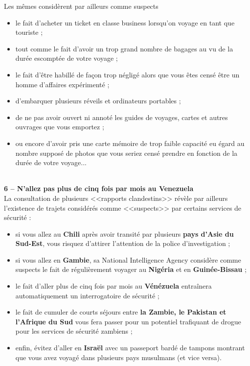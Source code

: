 \documentclass[11pt,twoside,a4paper]{article}
\begin{document}
Les m{\^e}mes consid{\`e}rent par ailleurs comme suspects
\begin{itemize}
	\item le fait d'acheter un ticket en classe business lorsqu'on voyage en tant que touriste ;
	\item tout comme le fait d'avoir un trop grand nombre de bagages au vu de la dur{\'e}e escompt{\'e}e de votre voyage ;
	\item le fait d'{\^e}tre habill{\'e} de fa\c{c}on trop n{\'e}glig{\'e} alors que vous {\^e}tes cens{\'e} {\^e}tre un homme d'affaires exp{\'e}riment{\'e} ;
	\item d'embarquer plusieurs r{\'e}veils et ordinateurs portables ;
	\item de ne pas avoir ouvert ni annot{\'e} les guides de voyages, cartes et autres ouvrages que vous emportez ;
	\item ou encore d'avoir pris une carte m{\'e}moire de trop faible capacit{\'e} eu {\'e}gard au nombre suppos{\'e} de photos que vous seriez cens{\'e} prendre en fonction de la dur{\'e}e de votre voyage...
\end{itemize}~\\

\textbf{\large 6 -- N'allez pas plus de cinq fois par mois au Venezuela}~\\

La consultation de plusieurs <<rapports clandestins>> r{\'e}v{\`e}le par ailleurs l'existence de trajets consid{\'e}r{\'e}s comme <<suspects>> par certains services de s{\'e}curit{\'e} :
\begin{itemize}
	\item si vous allez au \textbf{Chili} apr{\`e}s avoir transit{\'e} par plusieurs \textbf{pays d'Asie du Sud-Est}, vous risquez d'attirer l'attention de la police d'investigation ;
	\item si vous allez en \textbf{Gambie}, sa National Intelligence Agency consid{\`e}re comme suspects le fait de r{\'e}guli{\`e}rement voyager au \textbf{Nig{\'e}ria} et en \textbf{Guin{\'e}e-Bissau}  ;
	\item le fait d'aller plus de cinq fois par mois au \textbf{V{\'e}n{\'e}zuela} entra{\^i}nera automatiquement un interrogatoire de s{\'e}curit{\'e} ;
	\item le fait de cumuler de courts s{\'e}jours entre \textbf{la Zambie, le Pakistan et l'Afrique du Sud} vous fera passer pour un potentiel trafiquant de drogue pour les services de s{\'e}curit{\'e} zambiens ;
	\item enfin, {\'e}vitez d'aller en \textbf{Isra{\"e}l} avec un passeport bard{\'e} de tampons montrant que vous avez voyag{\'e} dans plusieurs pays musulmans (et vice versa).
\end{itemize}
\end{document}
